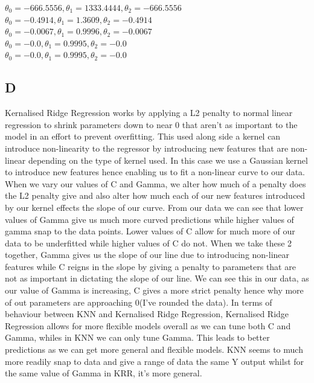\documentclass[11pt]{article} %
\begin{document}
\begin{figure}[h]
\qquad
{}
\end{figure}
\(\theta_0= -666.5556, \theta_1= 1333.4444 , \theta_2= -666.5556\)\\
\(\theta_0= -0.4914, \theta_1= 1.3609 , \theta_2= -0.4914\)\\
\(\theta_0= -0.0067, \theta_1= 0.9996 , \theta_2= -0.0067\)\\
\(\theta_0= -0.0, \theta_1= 0.9995 , \theta_2= -0.0\)\\
\(\theta_0= -0.0, \theta_1= 0.9995 , \theta_2= -0.0\)\\

\clearpage
\subsection{D}
Kernalised Ridge Regression works by applying a L2 penalty to normal linear regression to shrink parameters down to near 0 that aren't as important to the model in an effort to prevent overfitting. This used along side a kernel can introduce non-linearity to the regressor by introducing new features that are non-linear depending on the type of kernel used. In this case we use a Gaussian kernel to introduce new features hence enabling us to fit a non-linear curve to our data. When we vary our values of C and Gamma, we alter how much of a penalty does the L2 penalty give and also alter how much each of our new features introduced by our kernel effects the slope of our curve. From our data we can see that lower values of Gamma give us much more curved predictions while higher values of gamma snap to the data points. Lower values of C allow for much more of our data to be underfitted while higher values of C do not. When we take these 2 together, Gamma gives us the slope of our line due to introducing non-linear features while C reigns in the slope by giving a penalty to parameters that are not as important in dictating the slope of our line. We can see this in our data, as our value of Gamma is increasing, C gives a more strict penalty hence why more of out parameters are approaching 0(I've rounded the data).  In terms of behaviour between KNN and Kernalised Ridge Regression, Kernalised Ridge Regression allows for more flexible models overall as we can tune both C and Gamma, whiles in KNN we can only tune Gamma. This leads to better predictions as we can get more general and flexible models. KNN seems to much more readily snap to data and give a range of data the same Y output whilst for the same value of Gamma in KRR, it's more general. 
\end{document}
